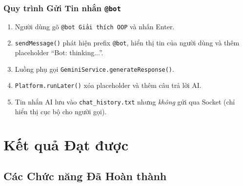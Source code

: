 \documentclass[12pt, a4paper, oneside]{report}
\newcommand{\code}[1]{\texttt{\color{hustblue!80!black}#1}}
\begin{document}
\subsection{Quy trình Gửi Tin nhắn \texttt{@bot}}

\begin{enumerate}[leftmargin=2em, itemsep=4pt]
  \item Người dùng gõ \code{@bot Giải thích OOP} và nhấn Enter.
  \item \code{sendMessage()} phát hiện prefix \code{@bot}, hiển thị tin
    của người dùng và thêm placeholder ``Bot: thinking...''.
  \item Luồng phụ gọi \code{GeminiService.generateResponse()}.
  \item \code{Platform.runLater()} xóa placeholder và thêm câu trả lời AI.
  \item Tin nhắn AI lưu vào \code{chat\_history.txt} nhưng \textit{không}
    gửi qua Socket (chỉ hiển thị cục bộ cho người gọi).
\end{enumerate}

\chapter{Kết quả Đạt được}

\section{Các Chức năng Đã Hoàn thành}
\end{document}
